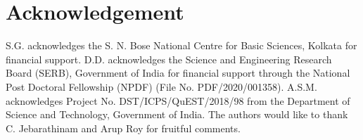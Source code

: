 \documentclass[reprint,superscriptaddress,nofootinbib,amsmath,amssymb,aps,pra,longbibliography]{revtex4-1}
\begin{document}
\section*{Acknowledgement} 
 S.G. acknowledges the S. N. Bose National Centre for Basic Sciences, Kolkata for financial support. D.D. acknowledges the Science and Engineering Research Board (SERB), Government of India for financial support through the National Post Doctoral Fellowship (NPDF) (File No. PDF/2020/001358).  A.S.M. acknowledges Project No. DST/ICPS/QuEST/2018/98
from the Department of Science and Technology, Government of India. The authors would like to thank C. Jebarathinam and Arup Roy for fruitful comments. 
 
\begin{widetext}
\appendix


\end{widetext}
\end{document}
